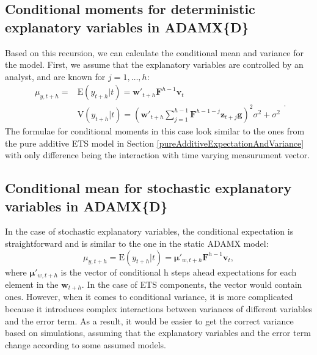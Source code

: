 \documentclass[]{book}
\theoremstyle{definition}
\theoremstyle{definition}
\theoremstyle{definition}
\theoremstyle{definition}
\theoremstyle{remark}
\begin{document}
\hypertarget{conditional-moments-for-deterministic-explanatory-variables-in-adamxd}{%
\subsection{Conditional moments for deterministic explanatory variables in ADAMX\{D\}}\label{conditional-moments-for-deterministic-explanatory-variables-in-adamxd}}

Based on this recursion, we can calculate the conditional mean and variance for the model. First, we assume that the explanatory variables are controlled by an analyst, and are known for \(j=1, \dots, h\):
\begin{equation}
  \begin{aligned}
    \mu_{y,t+h} = & \text{E}(y_{t+h}|t) = \mathbf{w}'_{t+h} \mathbf{F}^{h-1} \mathbf{v}_{t} \\
    & \text{V}(y_{t+h}|t) = \left(\mathbf{w}'_{t+h} \sum_{j=1}^{h-1} \mathbf{F}^{h-1-j} \mathbf{z}_{t+j} \mathbf{g} \right)^2 \sigma^2 + \sigma^2
  \end{aligned} .
  \label{eq:ADAMETSXPureAdditiveDynamicNonSeasonalMomentsNonRandom}
\end{equation}
The formulae for conditional moments in this case look similar to the ones from the pure additive ETS model in Section \ref{pureAdditiveExpectationAndVariance} with only difference being the interaction with time varying measurument vector.

\hypertarget{conditional-mean-for-stochastic-explanatory-variables-in-adamxd}{%
\subsection{Conditional mean for stochastic explanatory variables in ADAMX\{D\}}\label{conditional-mean-for-stochastic-explanatory-variables-in-adamxd}}

In the case of stochastic explanatory variables, the conditional expectation is straightforward and is similar to the one in the static ADAMX model:
\begin{equation}
    \mu_{y,t+h} = \text{E}(y_{t+h}|t) = \boldsymbol{\mu}'_{w,t+h} \mathbf{F}^{h-1} \mathbf{v}_{t} ,
  \label{eq:ADAMETSXPureAdditiveDynamicNonSeasonalMomentsRandom}
\end{equation}
where \(\boldsymbol{\mu}'_{w,t+h}\) is the vector of conditional h steps ahead expectations for each element in the \(\mathbf{w}_{t+h}\). In the case of ETS components, the vector would contain ones. However, when it comes to conditional variance, it is more complicated because it introduces complex interactions between variances of different variables and the error term. As a result, it would be easier to get the correct variance based on simulations, assuming that the explanatory variables and the error term change according to some assumed models.
\end{document}
